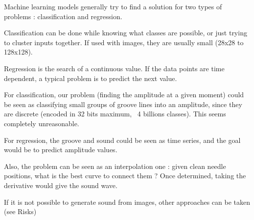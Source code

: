 \documentclass[12pt, twoside]{article}
\begin{document}
Machine learning models generally try to find a solution for two types of problems : classification and regression.

Classification can be done while knowing what classes are possible, or just trying to cluster inputs together. If used with images, they are usually small (28x28 to 128x128).

Regression is the search of a continuous value. If the data points are time dependent, a typical problem is to predict the next value.

For classification, our problem (finding the amplitude at a given moment) could be seen as classifying small groups of groove lines into an amplitude, since they are discrete (encoded in 32 bits maximum, ~4 billions classes). This seems completely unreasonable.

For regression, the groove and sound could be seen as time series, and the goal would be to predict amplitude values.

Also, the problem can be seen as an interpolation one : given clean needle positions, what is the best curve to connect them ? Once determined, taking the derivative would give the sound wave.

If it is not possible to generate sound from images, other approaches can be taken (see Risks)
\end{document}

